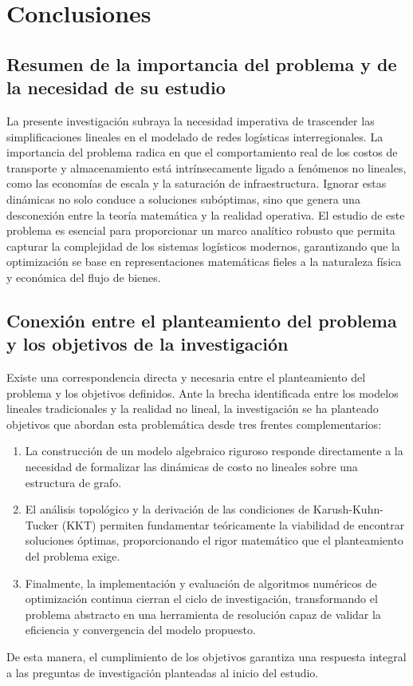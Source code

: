 \section{Conclusiones}

\subsection{Resumen de la importancia del problema y de la necesidad de su estudio}
La presente investigación subraya la necesidad imperativa de trascender las simplificaciones lineales en el modelado de redes logísticas interregionales. La importancia del problema radica en que el comportamiento real de los costos de transporte y almacenamiento está intrínsecamente ligado a fenómenos no lineales, como las economías de escala y la saturación de infraestructura. Ignorar estas dinámicas no solo conduce a soluciones subóptimas, sino que genera una desconexión entre la teoría matemática y la realidad operativa. El estudio de este problema es esencial para proporcionar un marco analítico robusto que permita capturar la complejidad de los sistemas logísticos modernos, garantizando que la optimización se base en representaciones matemáticas fieles a la naturaleza física y económica del flujo de bienes.

\subsection{Conexión entre el planteamiento del problema y los objetivos de la investigación}
Existe una correspondencia directa y necesaria entre el planteamiento del problema y los objetivos definidos. Ante la brecha identificada entre los modelos lineales tradicionales y la realidad no lineal, la investigación se ha planteado objetivos que abordan esta problemática desde tres frentes complementarios:
\begin{enumerate}
    \item La construcción de un modelo algebraico riguroso responde directamente a la necesidad de formalizar las dinámicas de costo no lineales sobre una estructura de grafo.
    \item El análisis topológico y la derivación de las condiciones de Karush-Kuhn-Tucker (KKT) permiten fundamentar teóricamente la viabilidad de encontrar soluciones óptimas, proporcionando el rigor matemático que el planteamiento del problema exige.
    \item Finalmente, la implementación y evaluación de algoritmos numéricos de optimización continua cierran el ciclo de investigación, transformando el problema abstracto en una herramienta de resolución capaz de validar la eficiencia y convergencia del modelo propuesto. 
\end{enumerate}
De esta manera, el cumplimiento de los objetivos garantiza una respuesta integral a las preguntas de investigación planteadas al inicio del estudio.
